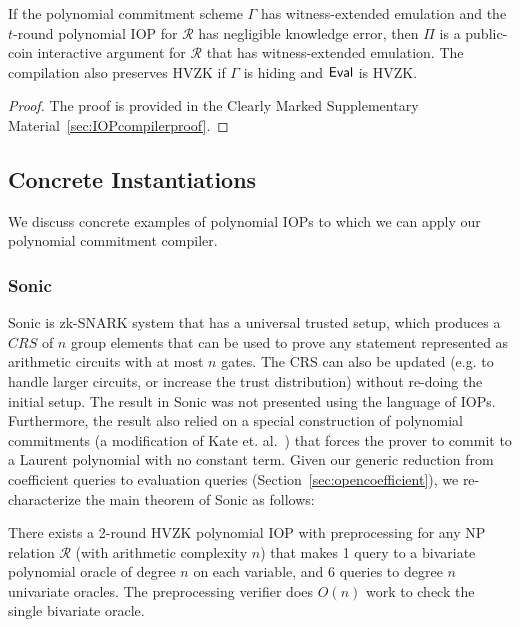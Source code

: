 \begin{theorem}\label{thm:IOPcompiler}
If the polynomial commitment scheme $\Gamma$ has witness-extended emulation and the $t$-round polynomial IOP for $\mathcal{R}$ has negligible knowledge error, then $\Pi$ is a public-coin interactive argument for $\mathcal{R}$ that has witness-extended emulation. The compilation also preserves HVZK if $\Gamma$ is hiding and $\textsf{{Eval}}$ is HVZK. 
\end{theorem}

\begin{proof}
The proof is provided in the Clearly Marked Supplementary Material~\ref{sec:IOPcompilerproof}.
\end{proof} 

\subsection{Concrete Instantiations} 
We discuss concrete examples of polynomial IOPs to which we can apply our polynomial commitment compiler. %

\subsubsection{Sonic} 
\textsf{Sonic} is zk-SNARK system that has a universal trusted setup, which produces a $CRS$ of $n$ group elements that can be used to prove any statement represented as arithmetic circuits with at most $n$ gates. The CRS can also be updated (e.g. to handle larger circuits, or increase the trust distribution) without re-doing the initial setup. The result in \textsf{Sonic} was not presented using the language of IOPs. Furthermore, the result also relied on a special construction of polynomial commitments (a modification of Kate et. al.~\cite{AC:KatZavGol10}) that forces the prover to commit to a Laurent polynomial with no constant term. Given our generic reduction from coefficient queries to evaluation queries (Section~\ref{sec:opencoefficient}), we re-characterize the main theorem of \textsf{Sonic} as follows: 

\begin{theorem}
There exists a 2-round HVZK polynomial IOP with preprocessing for any NP relation $\mathcal{R}$ (with arithmetic complexity $n$) that makes 1 query to a bivariate polynomial oracle of degree $n$ on each variable, and 6 queries to degree $n$ univariate oracles. The preprocessing verifier does $O(n)$ work to check the single bivariate oracle. 
\end{theorem}

